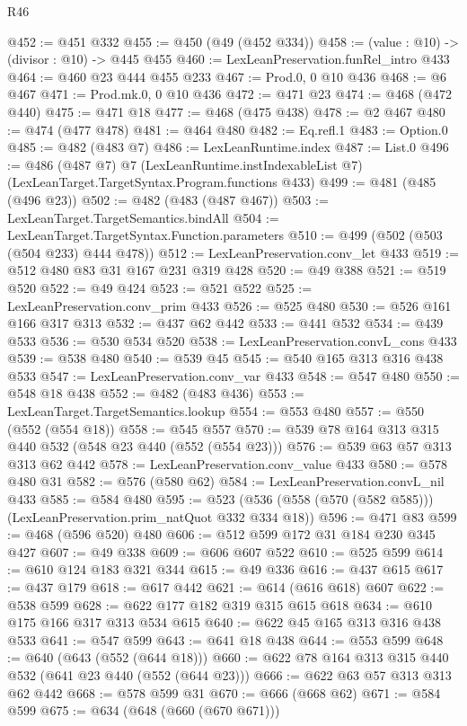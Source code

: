 \begin{lexlean}{R46}
\begin{coremodule}
@452 := @451 @332
@455 := @450 (@49 (@452 @334))
@458 := (value : @10) -> (divisor : @10) -> @445 @455
@460 := LexLeanPreservation.funRel_intro @433
@464 := @460 @23 @444 @455 @233
@467 := Prod.{0, 0} @10 @436
@468 := @6 @467
@471 := Prod.mk.{0, 0} @10 @436
@472 := @471 @23
@474 := @468 (@472 @440)
@475 := @471 @18
@477 := @468 (@475 @438)
@478 := @2 @467
@480 := @474 (@477 @478)
@481 := @464 @480
@482 := Eq.refl.{1}
@483 := Option.{0}
@485 := @482 (@483 @7)
@486 := LexLeanRuntime.index
@487 := List.{0}
@496 := @486
    (@487 @7)
    @7
    (LexLeanRuntime.instIndexableList @7)
    (LexLeanTarget.TargetSyntax.Program.functions @433)
@499 := @481 (@485 (@496 @23))
@502 := @482 (@483 (@487 @467))
@503 := LexLeanTarget.TargetSemantics.bindAll
@504 := LexLeanTarget.TargetSyntax.Function.parameters
@510 := @499 (@502 (@503 (@504 @233) @444 @478))
@512 := LexLeanPreservation.conv_let @433
@519 := @512 @480 @83 @31 @167 @231 @319 @428
@520 := @49 @388
@521 := @519 @520
@522 := @49 @424
@523 := @521 @522
@525 := LexLeanPreservation.conv_prim @433
@526 := @525 @480
@530 := @526 @161 @166 @317 @313
@532 := @437 @62 @442
@533 := @441 @532
@534 := @439 @533
@536 := @530 @534 @520
@538 := LexLeanPreservation.convL_cons @433
@539 := @538 @480
@540 := @539 @45
@545 := @540 @165 @313 @316 @438 @533
@547 := LexLeanPreservation.conv_var @433
@548 := @547 @480
@550 := @548 @18 @438
@552 := @482 (@483 @436)
@553 := LexLeanTarget.TargetSemantics.lookup
@554 := @553 @480
@557 := @550 (@552 (@554 @18))
@558 := @545 @557
@570 := @539 @78 @164 @313 @315 @440 @532 (@548 @23 @440 (@552 (@554 @23)))
@576 := @539 @63 @57 @313 @313 @62 @442
@578 := LexLeanPreservation.conv_value @433
@580 := @578 @480 @31
@582 := @576 (@580 @62)
@584 := LexLeanPreservation.convL_nil @433
@585 := @584 @480
@595 := @523 (@536 (@558 (@570 (@582 @585))) (LexLeanPreservation.prim_natQuot @332 @334 @18))
@596 := @471 @83
@599 := @468 (@596 @520) @480
@606 := @512 @599 @172 @31 @184 @230 @345 @427
@607 := @49 @338
@609 := @606 @607 @522
@610 := @525 @599
@614 := @610 @124 @183 @321 @344
@615 := @49 @336
@616 := @437 @615
@617 := @437 @179
@618 := @617 @442
@621 := @614 (@616 @618) @607
@622 := @538 @599
@628 := @622 @177 @182 @319 @315 @615 @618
@634 := @610 @175 @166 @317 @313 @534 @615
@640 := @622 @45 @165 @313 @316 @438 @533
@641 := @547 @599
@643 := @641 @18 @438
@644 := @553 @599
@648 := @640 (@643 (@552 (@644 @18)))
@660 := @622 @78 @164 @313 @315 @440 @532 (@641 @23 @440 (@552 (@644 @23)))
@666 := @622 @63 @57 @313 @313 @62 @442
@668 := @578 @599 @31
@670 := @666 (@668 @62)
@671 := @584 @599
@675 := @634 (@648 (@660 (@670 @671)))

\end{coremodule}
\end{lexlean}
